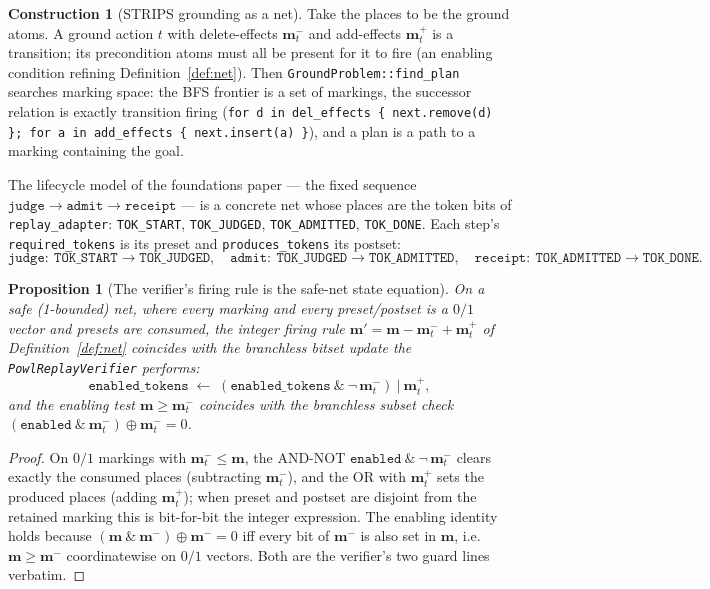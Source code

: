 \documentclass[11pt,oneside]{book}
\theoremstyle{definition}
\newtheorem{construction}{Construction}[chapter]
\theoremstyle{plain}
\newtheorem{proposition}[theorem]{Proposition}
\theoremstyle{remark}
\newcommand{\code}[1]{\texttt{#1}}
\begin{document}
\begin{construction}[STRIPS grounding as a net]\label{con:strips}
Take the places to be the ground atoms. A ground action $t$ with delete-effects $\bm
m^{-}_{t}$ and add-effects $\bm m^{+}_{t}$ is a transition; its precondition atoms must all be
present for it to fire (an enabling condition refining Definition~\ref{def:net}). Then
\code{GroundProblem::find\_plan} searches marking space: the BFS frontier is a set of markings,
the successor relation is exactly transition firing (\code{for d in del\_effects \{
next.remove(d) \}; for a in add\_effects \{ next.insert(a) \}}), and a plan is a path to a
marking containing the goal.
\end{construction}

The lifecycle model of the foundations paper --- the fixed sequence
$\code{judge}\to\code{admit}\to\code{receipt}$ --- is a concrete net whose places are the
token bits of \code{replay\_adapter}: \code{TOK\_START}, \code{TOK\_JUDGED},
\code{TOK\_ADMITTED}, \code{TOK\_DONE}. Each step's \code{required\_tokens} is its preset and
\code{produces\_tokens} its postset:
\[
\code{judge}:\ \code{TOK\_START}\!\to\!\code{TOK\_JUDGED},\quad
\code{admit}:\ \code{TOK\_JUDGED}\!\to\!\code{TOK\_ADMITTED},\quad
\code{receipt}:\ \code{TOK\_ADMITTED}\!\to\!\code{TOK\_DONE}.
\]

\begin{proposition}[The verifier's firing rule is the safe-net state equation]\label{prop:safe}
On a \emph{safe} (1-bounded) net, where every marking and every preset/postset is a $0/1$
vector and presets are consumed, the integer firing rule
$\bm m'=\bm m-\bm m^{-}_{t}+\bm m^{+}_{t}$ of Definition~\ref{def:net} coincides with the
branchless bitset update the \code{PowlReplayVerifier} performs:
\[
\code{enabled\_tokens}\;\gets\;(\code{enabled\_tokens}\ \&\ \lnot\,\bm m^{-}_{t})\ |\ \bm m^{+}_{t},
\]
and the enabling test $\bm m\ge\bm m^{-}_{t}$ coincides with the branchless subset check
$(\code{enabled}\ \&\ \bm m^{-}_{t})\oplus \bm m^{-}_{t}=0$.
\end{proposition}

\begin{proof}
On $0/1$ markings with $\bm m^{-}_{t}\le\bm m$, the AND-NOT $\code{enabled}\ \&\ \lnot\,\bm
m^{-}_{t}$ clears exactly the consumed places (subtracting $\bm m^{-}_{t}$), and the OR with
$\bm m^{+}_{t}$ sets the produced places (adding $\bm m^{+}_{t}$); when preset and postset are
disjoint from the retained marking this is bit-for-bit the integer expression. The enabling
identity holds because $(\bm m\ \&\ \bm m^{-})\oplus\bm m^{-}=0$ iff every bit of $\bm m^{-}$ is
also set in $\bm m$, i.e.\ $\bm m\ge\bm m^{-}$ coordinatewise on $0/1$ vectors. Both are the
verifier's two guard lines verbatim. \end{proof}
\end{document}
